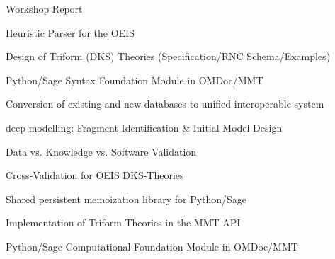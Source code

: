 \begin{workpackage}[id=dksbases,wphases=1-48!.5,
  title=Data/Knowledge/Software-Bases,lead=JU,
  ZHRM=12,JURM=36,UWRM=25,SARM=10,LLRM=2,PSRM=4]
\begin{wpdelivs}
  \begin{wpdeliv}[due=9,id=wsrep,dissem=PU,nature=R,lead=JU]{Workshop Report}
  \end{wpdeliv}
  \begin{wpdeliv}[due=9,id=oeisparser,dissem=PU,nature=OTHER,lead=JU]
      {Heuristic Parser for the OEIS}
  \end{wpdeliv}
  \begin{wpdeliv}[due=12,id=dkstheories,dissem=PU,nature=R,lead=JU]
        {Design of Triform (DKS) Theories (Specification/RNC Schema/Examples)}
  \end{wpdeliv}
  \begin{wpdeliv}[due=12,id=pssyntax,dissem=PU,nature=DEC,lead=JU]
        {Python/Sage Syntax Foundation Module in OMDoc/MMT}
  \end{wpdeliv}
  \begin{wpdeliv}[due=12,id=conv,dissem=PU,nature=DEC,lead=ZH]
        {Conversion of existing and new databases to unified interoperable system}
   \end{wpdeliv}
  \begin{wpdeliv}[due=12,id=lmfmod,dissem=PU,nature=R,lead=ZH]
      {\LMFDB deep modelling: Fragment Identification \& Initial Model Design}
  \end{wpdeliv}
  \begin{wpdeliv}[due=18,id=lmfval,dissem=PU,nature=R,lead=ZH]
      {\LMFDB Data vs. Knowledge vs. Software Validation}
  \end{wpdeliv}
  \begin{wpdeliv}[due=18,id=oeisvalidation,dissem=PU,nature=R,lead=JU]
      {Cross-Validation for OEIS DKS-Theories}
  \end{wpdeliv}
  \begin{wpdeliv}[due=24,id=persistent-memoization,dissem=PU,nature=OTHER,lead=SA]
    {Shared persistent memoization library for Python/Sage} 
  \end{wpdeliv}
  \begin{wpdeliv}[due=24,id=dksimp,dissem=PU,nature=OTHER,lead=JU]
        {Implementation of Triform Theories in the MMT API}
  \end{wpdeliv}
  \begin{wpdeliv}[due=24,id=psfoundation,dissem=PU,nature=OTHER,lead=JU]
        {Python/Sage Computational Foundation Module in OMDoc/MMT}
  \end{wpdeliv}
  \begin{wpdeliv}[due=36,id=pssem,dissem=PU,nature=OTHER,lead=JU]

\end{wpdeliv}
\end{wpdelivs}
\end{workpackage}
